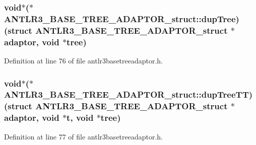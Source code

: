 \hypertarget{struct_a_n_t_l_r3___b_a_s_e___t_r_e_e___a_d_a_p_t_o_r__struct_a4835b9a40caacdadffa966b9c55b2cd2}{
\subsubsection[{dup\-Tree}]{\setlength{\rightskip}{0pt plus 5cm}void$\ast$($\ast$ A\-N\-T\-L\-R3\-\_\-\-B\-A\-S\-E\-\_\-\-T\-R\-E\-E\-\_\-\-A\-D\-A\-P\-T\-O\-R\-\_\-struct\-::dup\-Tree)(struct {\bf A\-N\-T\-L\-R3\-\_\-\-B\-A\-S\-E\-\_\-\-T\-R\-E\-E\-\_\-\-A\-D\-A\-P\-T\-O\-R\-\_\-struct} $\ast$adaptor, void $\ast$tree)}}\label{struct_a_n_t_l_r3___b_a_s_e___t_r_e_e___a_d_a_p_t_o_r__struct_a4835b9a40caacdadffa966b9c55b2cd2}


Definition at line 76 of file antlr3basetreeadaptor.\-h.

\hypertarget{struct_a_n_t_l_r3___b_a_s_e___t_r_e_e___a_d_a_p_t_o_r__struct_a5696836efd7978d4db91d59e018abda1}{
\subsubsection[{dup\-Tree\-T\-T}]{\setlength{\rightskip}{0pt plus 5cm}void$\ast$($\ast$ A\-N\-T\-L\-R3\-\_\-\-B\-A\-S\-E\-\_\-\-T\-R\-E\-E\-\_\-\-A\-D\-A\-P\-T\-O\-R\-\_\-struct\-::dup\-Tree\-T\-T)(struct {\bf A\-N\-T\-L\-R3\-\_\-\-B\-A\-S\-E\-\_\-\-T\-R\-E\-E\-\_\-\-A\-D\-A\-P\-T\-O\-R\-\_\-struct} $\ast$adaptor, void $\ast${\bf t}, void $\ast$tree)}}\label{struct_a_n_t_l_r3___b_a_s_e___t_r_e_e___a_d_a_p_t_o_r__struct_a5696836efd7978d4db91d59e018abda1}


Definition at line 77 of file antlr3basetreeadaptor.\-h.

